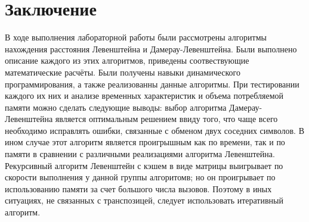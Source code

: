 \chapter*{Заключение}
В ходе выполнения лабораторной работы были рассмотрены алгоритмы нахождения расстояния Левенштейна и Дамерау-Левенштейна. Были выполнено описание каждого из этих алгоритмов, приведены соотвествующие математические расчёты. Были получены навыки динамического программирования, а также реализованны данные алгоритмы. При тестировании каждого их них и анализе временных характеристик и объема потребляемой памяти можно сделать следующие выводы: выбор алгоритма Дамерау-Левенштейна является оптимальным решением ввиду того, что чаще всего необходимо исправлять ошибки, связанные с обменом двух соседних символов. В ином случае этот алгоритм является проигрышным как по времени, так и по памяти в сравнении с различными реализациями алгоритма Левенштейна. Рекурсивный алгоритм Левенштейн с кэшем в виде матрицы выигрывает по скорости выполнения у данной группы алгоритомв; но он проигрывает по использованию памяти за счет большого числа вызовов. Поэтому в иных ситуациях, не связанных с транспозицей, следует использовать итеративный алгоритм.
  